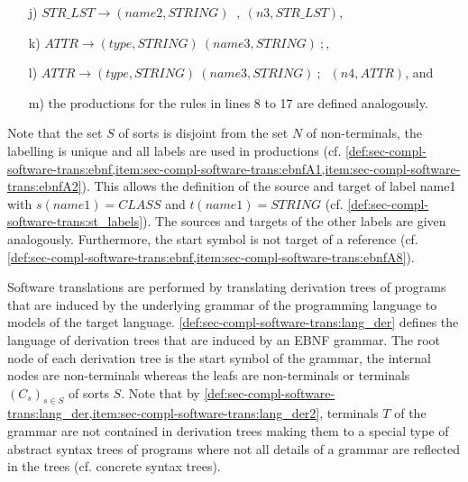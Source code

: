 \begin{example}
\begin{enumerate}
\begin{enumerate}
    \item[j)] $STR\_LST \to (name2,STRING)$ $\ ,\ (n3,STR\_LST)$,
    \item[k)] $ATTR \to (type,STRING)\ (name3,STRING)\ ;$,
    \item[l)] $ATTR \to (type,STRING)\ (name3,STRING)\ ;$ $\ (n4,ATTR)$, and
    \item[m)] the productions for the rules in lines 8 to 17 are defined analogously.
  \end{enumerate}
\end{enumerate}
Note that the set $S$ of sorts is disjoint from the set $N$ of non-terminals, the labelling is unique and all labels are used in productions (cf. \cref{def:sec-compl-software-trans:ebnf,item:sec-compl-software-trans:ebnfA1,item:sec-compl-software-trans:ebnfA2}).
This allows the definition of the source and target of label \textsf{name1} with $s(name1)=CLASS$ and $t(name1)=STRING$ (cf. \cref{def:sec-compl-software-trans:st_labels}).
The sources and targets of the other labels are given analogously.
Furthermore, the start symbol is not target of a reference (cf. \cref{def:sec-compl-software-trans:ebnf,item:sec-compl-software-trans:ebnfA8}).
\envEndMarker
\end{example}

Software translations are performed by translating derivation trees of programs that are induced by the underlying grammar of the programming language to models of the target language.
\cref{def:sec-compl-software-trans:lang_der} defines the language of derivation trees that are induced by an EBNF grammar.
The root node of each derivation tree is the start symbol of the grammar, the internal nodes are non-terminals whereas the leafs are non-terminals or terminals $(C_s)_{s \in S}$ of sorts $S$.
Note that by \cref{def:sec-compl-software-trans:lang_der,item:sec-compl-software-trans:lang_der2}, terminals $T$ of the grammar are not contained in derivation trees making them to a special type of abstract syntax trees of programs where not all details of a grammar are reflected in the trees (cf. concrete syntax trees).

